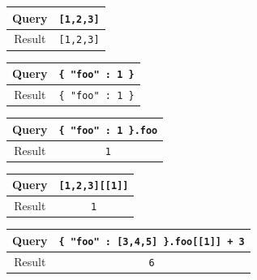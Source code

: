 \vspace{1\baselineskip}

\noindent
\begin{minipage}{0.2\textwidth}
\begin{center}
    \begin{tabular}{|c|c|}
        \hline
        Query & \texttt{[1,2,3]} \\ \hline
        Result & \texttt{[1,2,3]} \\ \hline
    \end{tabular}
\end{center}
\end{minipage}
\begin{minipage}{0.3\textwidth}
\begin{center}
    \begin{tabular}{|c|c|}
        \hline
        Query & \texttt{\{ "foo" : 1 \}} \\ \hline
        Result & \texttt{\{ "foo" : 1 \}} \\ \hline
    \end{tabular}
\end{center}
\end{minipage}
\begin{minipage}{0.3\textwidth}
\begin{center}
    \begin{tabular}{|c|c|}
        \hline
        Query & \texttt{\{ "foo" : 1 \}.foo} \\ \hline
        Result & \texttt{1} \\ \hline
    \end{tabular}
\end{center}
\end{minipage}

\vspace{1\baselineskip}

\noindent
\begin{minipage}{0.25\textwidth}
\begin{center}
    \begin{tabular}{|c|c|}
        \hline
        Query & \texttt{[1,2,3][[1]]} \\ \hline
        Result & \texttt{1} \\ \hline
    \end{tabular}
\end{center}
\end{minipage}
\begin{minipage}{0.5\textwidth}
\begin{center}
    \begin{tabular}{|c|c|}
        \hline
        Query & \texttt{\{ "foo" : [3,4,5] \}.foo[[1]] + 3} \\ \hline
        Result & \texttt{6} \\ \hline
    \end{tabular}
\end{center}
\end{minipage}

